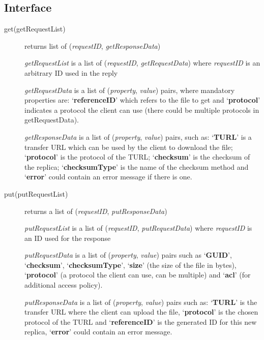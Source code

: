 \documentclass{book}
\begin{document}



\subsection{Interface} %

\begin{description}
    \item[get(getRequestList)] returns list of (\emph{requestID}, \emph{getResponseData})
    
    \emph{getRequestList} is a list of (\emph{requestID}, \emph{getRequestData}) where \emph{requestID} is an arbitrary ID used in the reply
    
    \emph{getRequestData} is a list of (\emph{property}, \emph{value}) pairs, where mandatory properties are: `\textbf{referenceID}' which refers to the file to get and `\textbf{protocol}' indicates a protocol the client can use (there could be multiple protocols in getRequestData).
    
    \emph{getResponseData} is a list of (\emph{property}, \emph{value}) pairs, such as: `\textbf{TURL}' is a transfer URL which can be used by the client to download the file; `\textbf{protocol}' is the protocol of the TURL; `\textbf{checksum}' is the checksum of the replica; `\textbf{checksumType}' is the name of the checksum method and `\textbf{error}' could contain an error message if there is one.
     
    \item[put(putRequestList)] returns a list of (\emph{requestID}, \emph{putResponseData})
    
    \emph{putRequestList} is a list of (\emph{requestID}, \emph{putRequestData}) where \emph{requestID} is an ID used for the response
    
    \emph{putRequestData} is a list of (\emph{property}, \emph{value}) pairs such as `\textbf{GUID}', `\textbf{checksum}', `\textbf{checksumType}', `\textbf{size}' (the size of the file in bytes), `\textbf{protocol}' (a protocol the client can use, can be multiple) and `\textbf{acl}' (for additional access policy).
    
    \emph{putResponseData} is a list of (\emph{property}, \emph{value}) pairs such as: `\textbf{TURL}' is the transfer URL where the client can upload the file, `\textbf{protocol}' is the chosen protocol of the TURL and `\textbf{referenceID}' is the generated ID for this new replica, `\textbf{error}' could contain an error message.
    

\end{description}
\end{document}
